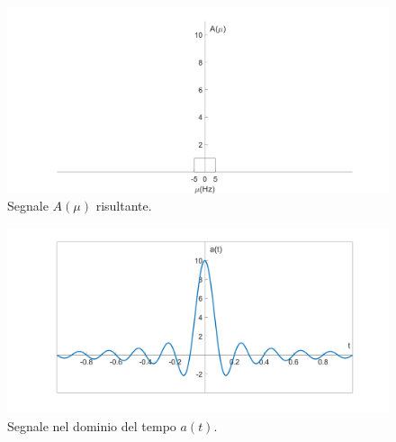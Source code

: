 \documentclass[a4paper]{article}
\begin{document}
	\begin{figure}[!htp]
		\centering
		\includegraphics[width=\textwidth]{img/segnale_A.PNG}
		\caption*{Segnale $A\left(\mu\right)$ risultante.}
	\end{figure}

	\begin{figure}[!htp]
		\centering
		\includegraphics[width=\textwidth]{img/segnale_a-tempo.PNG}
		\caption*{Segnale nel dominio del tempo $a\left(t\right)$.}
	\end{figure}\newpage
	
\end{document}
